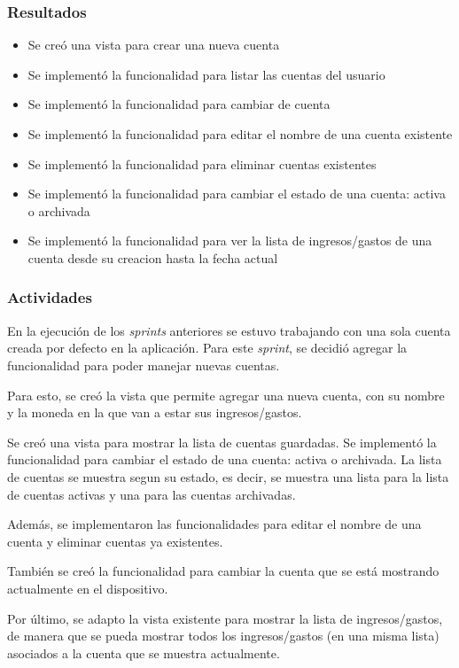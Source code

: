 \subsubsection{Resultados}
\begin{itemize}

\item Se creó una vista para crear una nueva cuenta
\item Se implementó la funcionalidad para listar las cuentas del usuario 
\item Se implementó la funcionalidad para cambiar de cuenta
\item Se implementó la funcionalidad para editar el nombre de una cuenta existente
\item Se implementó la funcionalidad para eliminar cuentas existentes
\item Se implementó la funcionalidad para cambiar el estado de una cuenta: activa o archivada
\item Se implementó la funcionalidad para ver la lista de ingresos/gastos de una cuenta desde su creacion hasta la fecha actual

\end{itemize}

\subsubsection{Actividades}
En la ejecución de los \textit{sprints} anteriores se estuvo trabajando con una sola cuenta creada por defecto en la aplicación. Para este \textit{sprint}, se decidió agregar la funcionalidad para poder manejar nuevas cuentas. 

Para esto, se creó la vista que permite agregar una nueva cuenta, con su nombre y la moneda en la que van a estar sus ingresos/gastos.

Se creó una vista para mostrar la lista de cuentas guardadas. Se implementó la funcionalidad para cambiar el estado de una cuenta: activa o archivada. La lista de cuentas se muestra segun su estado, es decir, se muestra una lista para la lista de cuentas activas y una para las cuentas archivadas. 

Además, se implementaron las funcionalidades para editar el nombre de una cuenta y eliminar cuentas ya existentes.

También se creó la funcionalidad para cambiar la cuenta que se está mostrando actualmente en el dispositivo.

Por último, se adapto la vista existente para mostrar la lista de ingresos/gastos, de manera que se pueda mostrar todos los ingresos/gastos (en una misma lista) asociados a la cuenta que se muestra actualmente.




